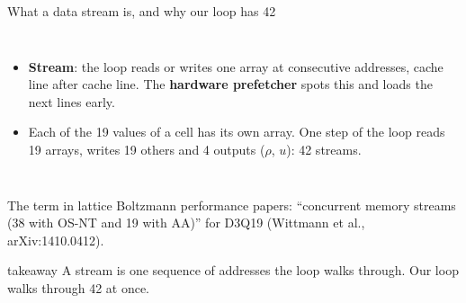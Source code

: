 \documentclass[aspectratio=169,10pt,t]{beamer}
\newcommand{\term}[1]{\textcolor{psblue!85!black}{\textbf{#1}}} %
\newcommand{\takeaway}[1]{\par\vfill
  \begin{beamercolorbox}[wd=\textwidth,sep=4pt,rounded=true]{takeaway}
    \small #1
  \end{beamercolorbox}}
\begin{document}
\begin{frame}{What a data stream is, and why our loop has 42}
  \begin{columns}[T,onlytextwidth]
    \vspace{1mm}
    \centering
    \vspace{1mm}
    \begin{itemize}\small
      \item \term{Stream}: the loop reads or writes one array at consecutive addresses, cache line
            after cache line. The \term{hardware prefetcher} spots this and loads the next lines early.
      \item<4-> Each of the 19 values of a cell has its own array. One step of the loop reads 19 arrays,
            writes 19 others and 4 outputs ($\rho$, $u$): 42 streams.
    \end{itemize}
  \end{columns}
  \vfill
  {\scriptsize\color{psgray}The term in lattice Boltzmann performance papers: ``concurrent memory streams
  (38 with OS-NT and 19 with AA)'' for D3Q19 (Wittmann et al., arXiv:1410.0412).\par}
  \takeaway{A stream is one sequence of addresses the loop walks through. Our loop walks through 42 at once.}
\end{frame}
\end{document}

